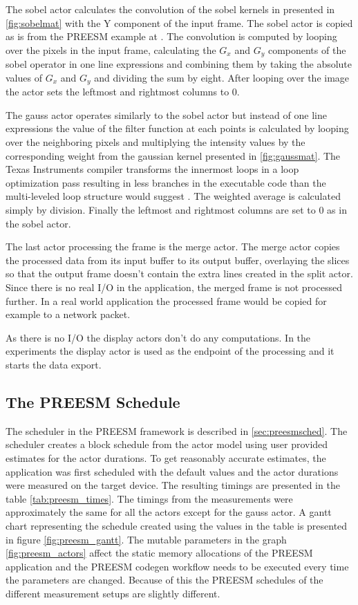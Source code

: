The sobel actor calculates the convolution of the sobel kernels in presented in
\ref{fig:sobelmat} with the Y component of the input frame. The sobel actor is
copied as is from the PREESM example at \cite{preesmtut}. The convolution is
computed by looping over the pixels in the input frame, calculating the $G_{x}$
and $G_{y}$ components of the sobel operator in one line expressions and
combining them by taking the absolute values of $G_{x}$ and $G_{y}$ and dividing
the sum by eight. After looping over the image the actor sets the leftmost and
rightmost columns to 0.

The gauss actor operates similarly to the sobel actor but instead of one line
expressions the value of the filter function at each points is calculated by
looping over the neighboring pixels and multiplying the intensity values by the
corresponding weight from the gaussian kernel presented in \ref{fig:gaussmat}.
The Texas Instruments compiler transforms the innermost loops in a loop
optimization pass resulting in less branches in the executable code than the
multi-leveled loop structure would suggest . The
weighted average is calculated simply by division. Finally the leftmost and
rightmost columns are set to 0 as in the sobel actor.

The last actor processing the frame is the merge actor. The merge actor copies
the processed data from its input buffer to its output buffer, overlaying the
slices so that the output frame doesn't contain the extra lines created in the
split actor. Since there is no real I/O in the application, the merged frame is
not processed further. In a real world application the processed frame would be
copied for example to a network packet.

As there is no I/O the display actors don't do any computations. In the
experiments the display actor is used as the endpoint of the processing and it
starts the data export. 

\subsection{The PREESM Schedule}
\label{subsec:preesmsched}
The scheduler in the PREESM framework is described in \ref{sec:preesmsched}.
The scheduler creates a block schedule from the actor model using user provided
estimates for the actor durations. To get reasonably accurate estimates, the
application was first scheduled with the default values and the actor durations
were measured on the target device. The resulting timings are presented in the
table \ref{tab:preesm_times}. The timings from the measurements were
approximately the same for all the actors except for the gauss actor. A gantt
chart representing the schedule created using the values in the table is
presented in figure \ref{fig:preesm_gantt}. The mutable parameters in the graph
\ref{fig:preesm_actors} affect the static memory allocations of the PREESM
application and the PREESM codegen workflow needs to be executed every time the
parameters are changed. Because of this the PREESM schedules of the different
measurement setups are slightly different.

